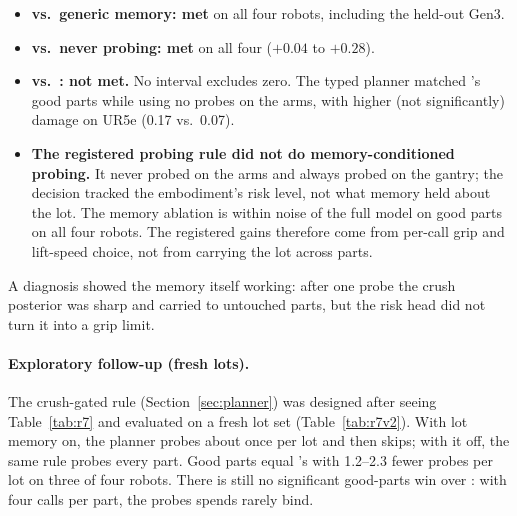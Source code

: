 \begin{itemize}
  \item \textbf{vs.\ generic memory: met} on all four robots, including the held-out Gen3.
  \item \textbf{vs.\ never probing: met} on all four ($+0.04$ to $+0.28$).
  \item \textbf{vs.\ \pta: not met.} No interval excludes zero. The typed planner matched \pta's good parts while
        using no probes on the arms, with higher (not significantly) damage on UR5e (0.17 vs.\ 0.07).
  \item \textbf{The registered probing rule did not do memory-conditioned probing.} It never probed on the arms
        and always probed on the gantry; the decision tracked the embodiment's risk level, not what memory held
        about the lot. The memory ablation is within noise of the full model on good parts on all four robots.
        The registered gains therefore come from per-call grip and lift-speed choice, not from carrying the
        lot across parts.
\end{itemize}
A diagnosis showed the memory itself working: after one probe the crush posterior was sharp and carried to
untouched parts, but the risk head did not turn it into a grip limit.

\paragraph{Exploratory follow-up (fresh lots).} The crush-gated rule (Section~\ref{sec:planner}) was designed
after seeing Table~\ref{tab:r7} and evaluated on a fresh lot set (Table~\ref{tab:r7v2}). With lot memory on,
the planner probes about once per lot and then skips; with it off, the same rule probes every part. Good parts
equal \pta's with 1.2--2.3 fewer probes per lot on three of four robots. There is still no significant
good-parts win over \pta: with four calls per part, the probes \pta{} spends rarely bind.

